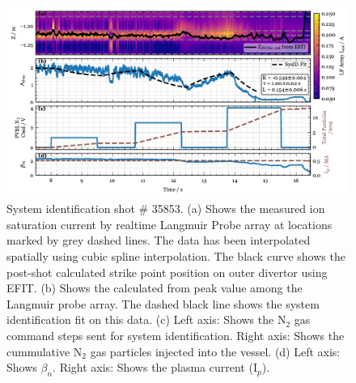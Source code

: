




\begin{figure}[!ht]
 \centering
 \includegraphics[width=\textwidth]{figures/DetCtrl_2D_35853.pdf}
 \caption{System identification shot \# 35853.
(a) Shows the measured ion saturation current by realtime Langmuir Probe array at locations marked by grey dashed lines.
The data has been interpolated spatially using cubic spline interpolation.
The black curve shows the post-shot calculated strike point position on outer divertor using EFIT.
(b) Shows the \Afrac calculated from peak value among the Langmuir probe array.
The dashed black line shows the system identification fit on this data.
(c) Left axis: Shows the N$_2$ gas command steps sent for system identification.
Right axis: Shows the cummulative N$_2$ gas particles injected into the vessel.
(d) Left axis: Shows $\beta_n$.
Right axis: Shows the plasma current (I$_p$).}
 \label{fig:sysid_afrac}
\end{figure}

